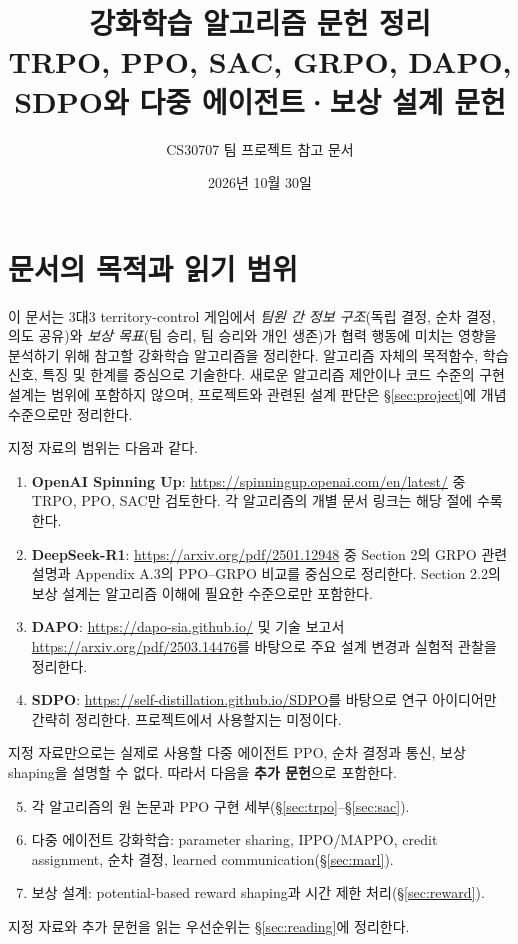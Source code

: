 \documentclass[11pt,a4paper]{article}
\title{강화학습 알고리즘 문헌 정리\\[3pt]\large TRPO, PPO, SAC, GRPO, DAPO, SDPO와 다중 에이전트·보상 설계 문헌}
\author{CS30707 팀 프로젝트 참고 문서}
\date{2026년 10월 30일}
\begin{document}
\maketitle

\section{문서의 목적과 읽기 범위}
이 문서는 3대3 territory-control 게임에서 \emph{팀원 간 정보 구조}(독립 결정, 순차 결정, 의도 공유)와 \emph{보상 목표}(팀 승리, 팀 승리와 개인 생존)가 협력 행동에 미치는 영향을 분석하기 위해 참고할 강화학습 알고리즘을 정리한다. 알고리즘 자체의 목적함수, 학습 신호, 특징 및 한계를 중심으로 기술한다. 새로운 알고리즘 제안이나 코드 수준의 구현 설계는 범위에 포함하지 않으며, 프로젝트와 관련된 설계 판단은 \S\ref{sec:project}에 개념 수준으로만 정리한다.

지정 자료의 범위는 다음과 같다.
\begin{enumerate}
 \item \textbf{OpenAI Spinning Up}: \url{https://spinningup.openai.com/en/latest/} 중 TRPO, PPO, SAC만 검토한다. 각 알고리즘의 개별 문서 링크는 해당 절에 수록한다.
 \item \textbf{DeepSeek-R1}: \url{https://arxiv.org/pdf/2501.12948} 중 Section 2의 GRPO 관련 설명과 Appendix A.3의 PPO--GRPO 비교를 중심으로 정리한다. Section 2.2의 보상 설계는 알고리즘 이해에 필요한 수준으로만 포함한다.
 \item \textbf{DAPO}: \url{https://dapo-sia.github.io/} 및 기술 보고서 \url{https://arxiv.org/pdf/2503.14476}를 바탕으로 주요 설계 변경과 실험적 관찰을 정리한다.
 \item \textbf{SDPO}: \url{https://self-distillation.github.io/SDPO}를 바탕으로 연구 아이디어만 간략히 정리한다. 프로젝트에서 사용할지는 미정이다.
\end{enumerate}

지정 자료만으로는 실제로 사용할 다중 에이전트 PPO, 순차 결정과 통신, 보상 shaping을 설명할 수 없다. 따라서 다음을 \textbf{추가 문헌}으로 포함한다.
\begin{enumerate}
 \setcounter{enumi}{4}
 \item 각 알고리즘의 원 논문과 PPO 구현 세부(\S\ref{sec:trpo}--\S\ref{sec:sac}).
 \item 다중 에이전트 강화학습: parameter sharing, IPPO/MAPPO, credit assignment, 순차 결정, learned communication(\S\ref{sec:marl}).
 \item 보상 설계: potential-based reward shaping과 시간 제한 처리(\S\ref{sec:reward}).
\end{enumerate}
지정 자료와 추가 문헌을 읽는 우선순위는 \S\ref{sec:reading}에 정리한다.
\end{document}
